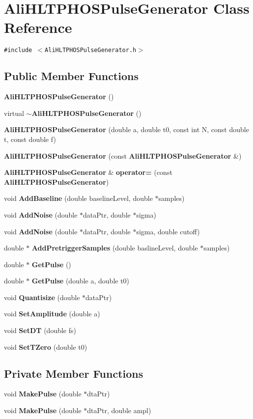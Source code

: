 \section{Ali\-HLTPHOSPulse\-Generator Class Reference}
\label{classAliHLTPHOSPulseGenerator}
{\tt \#include $<$Ali\-HLTPHOSPulse\-Generator.h$>$}

\subsection*{Public Member Functions}
\begin{CompactItemize}
\item 
{\bf Ali\-HLTPHOSPulse\-Generator} ()
\item 
virtual {\bf $\sim$Ali\-HLTPHOSPulse\-Generator} ()
\item 
{\bf Ali\-HLTPHOSPulse\-Generator} (double a, double t0, const int N, const double t, const double f)
\item 
{\bf Ali\-HLTPHOSPulse\-Generator} (const {\bf Ali\-HLTPHOSPulse\-Generator} \&)
\item 
{\bf Ali\-HLTPHOSPulse\-Generator} \& {\bf operator=} (const {\bf Ali\-HLTPHOSPulse\-Generator})
\item 
void {\bf Add\-Baseline} (double baseline\-Level, double $\ast$samples)
\item 
void {\bf Add\-Noise} (double $\ast$data\-Ptr, double $\ast$sigma)
\item 
void {\bf Add\-Noise} (double $\ast$data\-Ptr, double $\ast$sigma, double cutoff)
\item 
double $\ast$ {\bf Add\-Pretrigger\-Samples} (double basline\-Level, double $\ast$samples)
\item 
double $\ast$ {\bf Get\-Pulse} ()
\item 
double $\ast$ {\bf Get\-Pulse} (double a, double t0)
\item 
void {\bf Quantisize} (double $\ast$data\-Ptr)
\item 
void {\bf Set\-Amplitude} (double a)
\item 
void {\bf Set\-DT} (double fs)
\item 
void {\bf Set\-TZero} (double t0)
\end{CompactItemize}
\subsection*{Private Member Functions}
\begin{CompactItemize}
\item 
void {\bf Make\-Pulse} (double $\ast$dta\-Ptr)
\item 
void {\bf Make\-Pulse} (double $\ast$dta\-Ptr, double ampl)
\end{CompactItemize}
